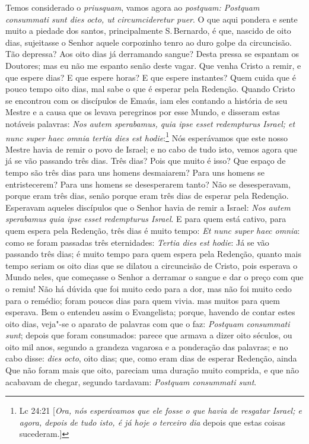 Temos considerado o \emph{priusquam}, vamos agora ao \emph{postquam:
Postquam consummati sunt dies octo, ut circumcideretur puer}. O que aqui
pondera e sente muito a piedade dos santos, principalmente S.\,Bernardo,
é que, nascido de oito dias, sujeitasse o Senhor aquele corpozinho tenro
ao duro golpe da circuncisão. Tão depressa? Aos oito dias já derramando
sangue? Desta pressa se espantam os Doutores; mas eu não me espanto
senão deste vagar. Que venha Cristo a remir, e que espere dias? E que
espere horas? E que espere instantes? Quem cuida que é pouco tempo
oito dias, mal sabe o que é esperar pela Redenção.
Quando Cristo se encontrou com os discípulos de Emaús, iam eles contando
a história de seu Mestre e a causa que os levava peregrinos por esse
Mundo, e disseram estas notáveis palavras: \emph{Nos autem sperabamus,
quia ipse esset redempturus Israel; et nunc super haec omnia tertia dies
est hodie}:\footnote{Lc 24:21 [\textit{Ora, nós esperávamos que ele fosse o que havia de resgatar Israel; e agora, depois de tudo isto, é já hoje o terceiro dia} depois que estas coisas sucederam.]} Nós esperávamos que este nosso Mestre havia de remir o povo
de Israel; e no cabo de tudo isto, vemos agora que já se vão passando
três dias. Três dias? Pois que muito é isso? Que espaço de tempo são
três dias para uns homens desmaiarem? Para uns homens se entristecerem?
Para uns homens se desesperarem tanto? Não se desesperavam, porque
eram três dias, senão porque eram três dias de esperar pela Redenção.
Esperavam aqueles discípulos que o Senhor havia de remir a Israel:
\emph{Nos autem sperabamus quia ipse esset redempturus Israel}. E para
quem está cativo, para quem espera pela Redenção, três dias é muito
tempo: \emph{Et nunc super haec omnia}: como se foram passadas três
eternidades: \emph{Tertia dies est hodie}: Já se vão passando três dias;
é muito tempo para quem espera pela Redenção, quanto mais tempo seriam
os oito dias que se dilatou a circuncisão de Cristo, pois
esperava o Mundo neles, que começasse o Senhor a derramar o sangue e dar
o preço com que o remiu!
Não há dúvida que foi muito cedo para a dor, mas não foi muito cedo para
o remédio; foram poucos dias para quem vivia. mas muitos para quem
esperava. Bem o entendeu assim o Evangelista; porque, havendo de contar
estes oito dias, veja"-se
o aparato de palavras com que o faz: \emph{Postquam consummati sunt};
depois que foram consumados: parece que armava a dizer oito séculos,
ou oito mil anos, segundo a grandeza vagarosa e a ponderação das
palavras; e no cabo disse: \emph{dies octo}, oito dias; que, como eram
dias de esperar Redenção, ainda Que não foram mais que oito, pareciam
uma duração muito comprida, e que não acabavam de chegar, segundo
tardavam: \emph{Postquam consummati sunt}.

